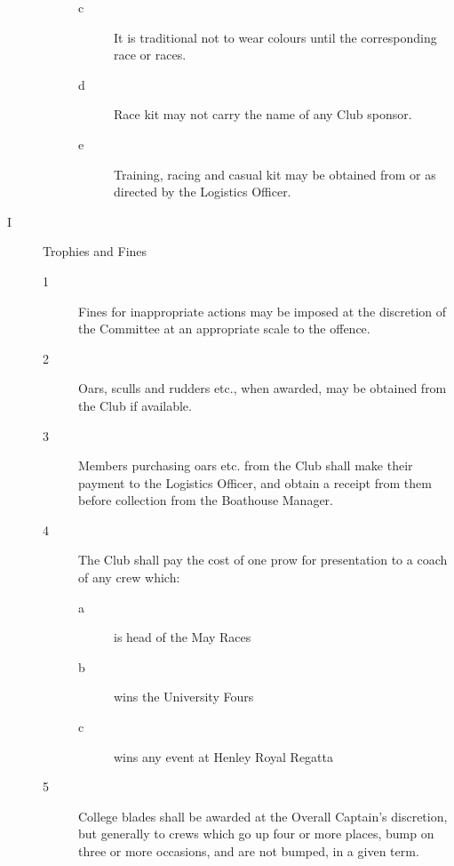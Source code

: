 \documentclass{article}
\begin{document}
\begin{description}
\begin{description}
\begin{description}
		\item[c] It is traditional not to wear colours until the corresponding race or
		races.\\
		
		\item[d] Race kit may not carry the name of any Club sponsor.\\
		
		\item[e] Training, racing and casual kit may be obtained from or as directed by
		the Logistics Officer.\\
		
	\end{description}
	\end{description}
	\item[I] Trophies and Fines
	\begin{description}
		\item[1] Fines for inappropriate actions may be imposed at the discretion of the
		Committee at an appropriate scale to the offence.\\
		
		\item[2] Oars, sculls and rudders etc., when awarded, may be obtained from the Club if
		available.\\
		
		\item[3] Members purchasing oars etc. from the Club shall make their payment to the
		Logistics Officer, and obtain a receipt from them before collection from the
		Boathouse Manager.\\
		
		\item[4] The Club shall pay the cost of one prow for presentation to a coach of any
		crew which:
		\begin{description}
			\item[a] is head of the May Races
			\item[b] wins the University Fours
			\item[c] wins any event at Henley Royal Regatta\\
		\end{description}
		
		\item[5] College blades shall be awarded at the Overall Captain's discretion, but
		generally to crews which go up four or more places, bump on three or more
		occasions, and are not bumped, in a given term.\\
		

\end{description}
\end{description}
\end{document}
